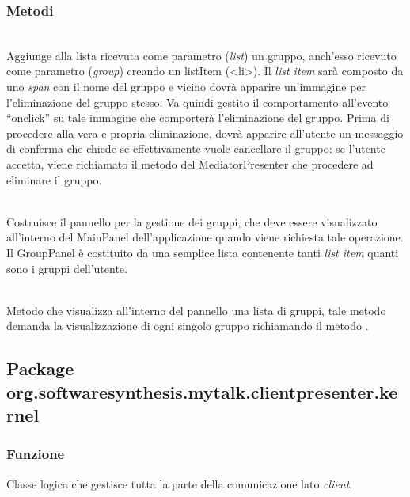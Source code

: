 \subsubsection*{Metodi}
\begin{description}
\item{}\\
Aggiunge alla lista ricevuta come parametro (\textit{list}) un gruppo, anch'esso ricevuto come parametro (\textit{group}) creando un listItem (<li>). Il \textit{list item} sarà composto da uno \textit{span} con il nome del gruppo e vicino dovrà apparire un'immagine per l'eliminazione del gruppo stesso. Va quindi gestito il comportamento all'evento ``onclick'' su tale immagine che comporterà l'eliminazione del gruppo. Prima di procedere alla vera e propria eliminazione, dovrà apparire all'utente un messaggio di conferma che chiede se effettivamente vuole cancellare il gruppo: se l'utente accetta, viene richiamato il metodo del MediatorPresenter  che procedere ad eliminare il gruppo.

\item{}\\
Costruisce il pannello per la gestione dei gruppi, che deve essere visualizzato all'interno del MainPanel dell'applicazione quando viene richiesta tale operazione. Il GroupPanel è costituito da una semplice lista contenente tanti \textit{list item} quanti sono i gruppi dell'utente.

\item{}\\
Metodo che visualizza all'interno del pannello una lista di gruppi, tale metodo demanda la visualizzazione di ogni singolo gruppo richiamando il metodo .

\end{description}

\subsection{Package org.softwaresynthesis.mytalk.clientpresenter.kernel}\label{sec:kernel}

\subsubsection*{Funzione}
Classe logica che gestisce tutta la parte della comunicazione lato \textit{client}.

